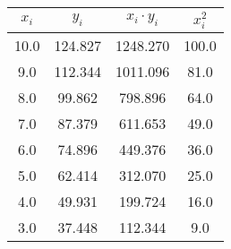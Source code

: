 \begin{tabular}{cccc}
\toprule
 $x_i$ &   $y_i$ &  $x_i \cdot y_i$ &  $x_i^2$ \\
\midrule
  10.0 & 124.827 &         1248.270 &    100.0 \\
   9.0 & 112.344 &         1011.096 &     81.0 \\
   8.0 &  99.862 &          798.896 &     64.0 \\
   7.0 &  87.379 &          611.653 &     49.0 \\
   6.0 &  74.896 &          449.376 &     36.0 \\
   5.0 &  62.414 &          312.070 &     25.0 \\
   4.0 &  49.931 &          199.724 &     16.0 \\
   3.0 &  37.448 &          112.344 &      9.0 \\
\bottomrule
\end{tabular}
